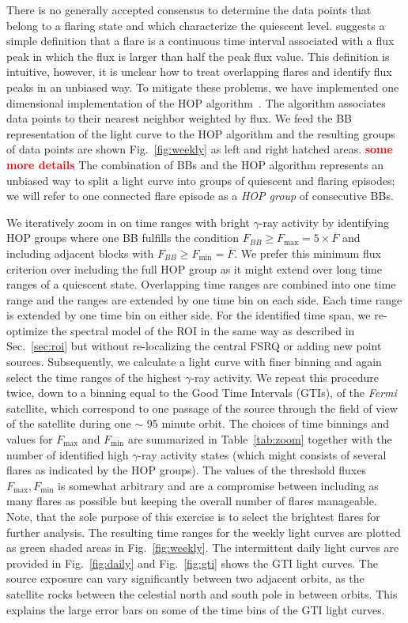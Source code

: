 \documentclass[twocolumn]{aastex62}
\newcommand{\gray}{$\gamma$-ray\xspace}
\newcommand{\Fermi}{\emph{Fermi}\xspace}
\newcommand{\todo}[1]{\textbf{\textcolor{red}{#1}}}
\begin{document}
There is no generally accepted consensus to determine the data points that belong to a flaring state and which characterize the quiescent level. \citet{2013MNRAS.430.1324N} suggests a simple definition that a flare is a continuous time interval associated with a flux peak in which the flux is larger than half the peak flux value. 
This definition is intuitive, however, it is unclear how to treat overlapping flares and identify flux peaks in an unbiased way. To mitigate these problems, we have implemented one dimensional implementation of the HOP algorithm~\citep{1998ApJ...498..137E}.
The algorithm associates data points to their nearest neighbor weighted by flux.
We feed the BB representation of the light curve to the HOP algorithm and the resulting groups of data points are shown 
Fig.~\ref{fig:weekly} as left and right hatched areas. \todo{some more details}
The combination of BBs and the HOP algorithm represents an unbiased way to split a light curve into groups of quiescent and flaring episodes; we will refer to one connected flare episode as a \emph{HOP group} of consecutive BBs.

We iteratively zoom in on time ranges with bright \gray activity by identifying HOP groups where one BB fulfills the condition $F_{BB} \geqslant F_\mathrm{max} =  5\times\overline{F}$ and including adjacent blocks with $F_{BB} \geqslant F_\mathrm{min} = \overline{F}$. We prefer this minimum flux criterion over including the full HOP group as it might extend over long time ranges of a quiescent state.
Overlapping time ranges are combined into one time range and the ranges are extended by one time bin on each side. Each time range is extended by one time bin on either side.
For the identified time span, we re-optimize the spectral model of the ROI in the same way as described in Sec.~\ref{sec:roi} but without re-localizing the central FSRQ or adding new point sources. Subsequently, we calculate a light curve with finer binning and again select the time ranges of the highest \gray activity. We repeat this procedure twice, down to a binning equal to the Good Time Intervals (GTIs), of the \Fermi satellite, which correspond to one passage of the source through the field of view of the satellite during one $\sim$ 95 minute orbit.
The choices of time binnings and values for $F_\mathrm{max}$ and $F_\mathrm{min}$ are summarized in Table~\ref{tab:zoom} together with the number of identified high \gray activity states (which might consists of several flares as indicated by the HOP groups).
The values of the threshold fluxes $F_\mathrm{max}, F_\mathrm{min}$ is somewhat arbitrary and are a compromise between including as many flares as possible but keeping the overall number of flares manageable. Note, that the sole purpose of this exercise is to select the brightest flares for  further analysis. 
The resulting time ranges for the weekly light curves are plotted as green shaded areas in Fig.~\ref{fig:weekly}.
The intermittent daily light curves are provided in Fig.~\ref{fig:daily} and  Fig.~\ref{fig:gti} shows the GTI light curves. 
The source exposure can vary significantly between two adjacent orbits, as the satellite rocks between the celestial north and south pole in between orbits. This explains the large error bars on some of the time bins of the GTI light curves.
\end{document}
